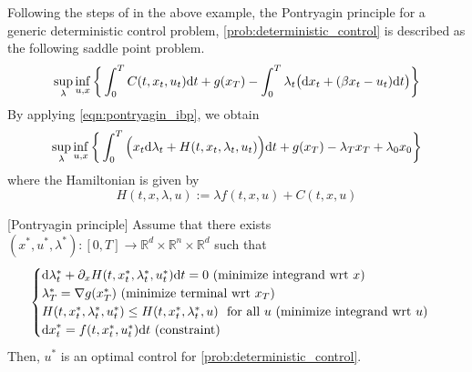 \documentclass[11pt]{book}
\newcommand{\dd}{\text{\normalfont d}}
\newcommand{\dt}{\text{\normalfont d}t}
\newcommand{\dx}{\text{\normalfont d}x}
\begin{document}
Following the steps of in the above example, the Pontryagin principle for a generic deterministic control problem, \ref{prob:deterministic_control} is described as the following saddle point problem.
\begin{equation}\label{eqn:sup_inf}
    \sup_{\lambda}\inf_{u,x}\bigg\{\int_0^TC(t,x_t,u_t) {{\dt}} +g(x_T) - \int_0^T \lambda_t \big({\dx}_t + (\beta x_t  - u_t ){{\dt}}\big)\bigg\}
\end{equation}
By applying \eqref{eqn:pontryagin_ibp}, we obtain 
\begin{equation}
    \sup_{\lambda}\inf_{u,x}\bigg\{\int_0^T\Big(x_t {\dd}\lambda_t+ H(t,x_t,\lambda_t,u_t)\Big) {{\dt}} +g(x_T) - \lambda_T x_T + \lambda_0 x_0\bigg\}
\end{equation}
where the Hamiltonian is given by 
\begin{equation}
    H(t,x,\lambda,u):=\lambda f(t,x,u)+ C(t,x,u)
\end{equation} 
\begin{thm}\label{thm:pontryagin_deterministc}
    [Pontryagin principle]
    Assume that there exists $(x^*,u^*,\lambda^*):[0,T]\to\mathbb{R}^d\times\mathbb{R}^n\times\mathbb{R}^d$ such that
    \begin{equation}\label{eqn:pontryagin_determinimstic}
    \begin{cases}
        {\dd}\lambda^*_t+ \partial_x H(t,x^*_t,\lambda^*_t,u^*_t){{\dt}}=0~ (\textrm{minimize integrand wrt $x$})\\
        \lambda^*_T=\nabla g(x^*_T) ~(\textrm{minimize terminal wrt $x_T$})\\
        H(t,x^*_t,\lambda^*_t,u^*_t)\le H(t,x^*_t,\lambda^*_t,u)~\textrm{ for all } u ~(\textrm{minimize integrand wrt $u$})\\
        {\dx}^*_t = f(t,x^*_t,u^*_t) {{\dt}} ~(\textrm{constraint})
        \end{cases}
\end{equation}
Then, $u^*$ is an optimal control for \eqref{prob:deterministic_control}.
\end{thm}
\end{document}
